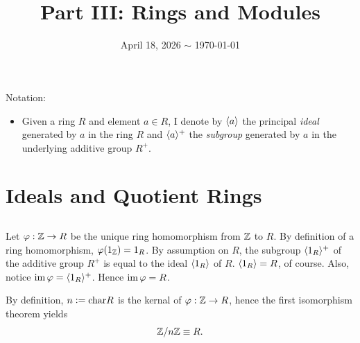 \documentclass[12pt]{article}
\title{\course\ \\ Part III: Rings and Modules}
\author{\myname}
\date{April 18, 2026 $\sim$ \today}
\begin{document}
\maketitle
\thispagestyle{fancy}

\newcommand{\dirsum}[2]{#1^{\oplus#2}}


Notation: 
\begin{itemize}
  \item Given a ring $R$ and element $a \in R$, I denote by $\langle a\rangle$ the principal \textit{ideal} generated by $a$ in the ring $R$ and $\langle a\rangle^{+}$ the \textit{subgroup} generated by $a$ in the underlying additive group $R^{+}$. 
\end{itemize}

\setcounter{section}{2}
\section{Ideals and Quotient Rings}
\setcounter{subsection}{3} 
\subsection{}
Let $\varphi: \mathbb{Z} \rightarrow R$ be the unique ring homomorphism from $\mathbb{Z}$ to $R$. 
By definition of a ring homomorphism, $\varphi(1_{\mathbb{Z}}) = 1_{R}$. 
By assumption on $R$, the subgroup $\langle1_{R}\rangle^{+}$ of the additive group $R^{+}$ is equal to the ideal $\langle1_R\rangle$ of $R$. 
$\langle1_{R}\rangle = R$, of course. 
Also, notice $\operatorname{im} \varphi = \langle1_{R}\rangle^{+}$. 
Hence $\operatorname{im} \varphi = R$. 

By definition, $n \vcentcolon= \text{char}R$ is the kernal of $\varphi: \mathbb{Z} \rightarrow R$, hence the first isomorphism theorem yields 
$$\Z / n\Z \equiv R.$$
\end{document}
